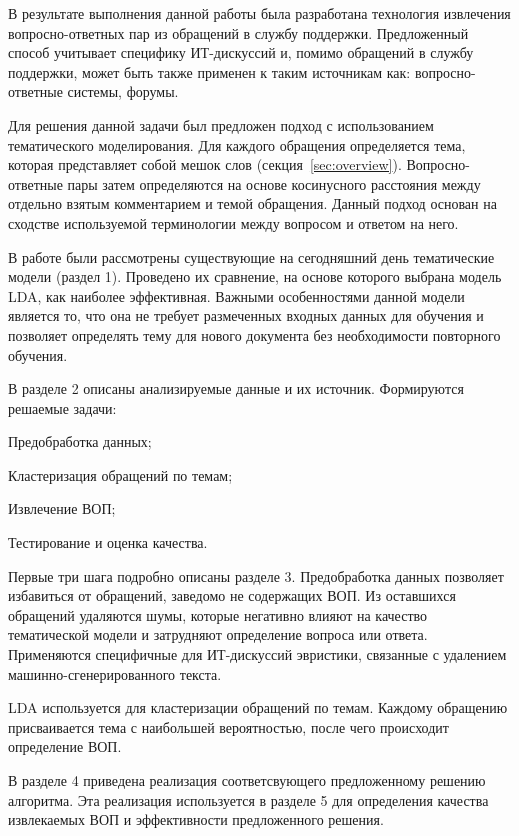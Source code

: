 \conclusion
В результате выполнения данной работы была разработана технология извлечения вопросно-ответных пар из обращений в службу поддержки. Предложенный способ учитывает специфику ИТ-дискуссий и, помимо обращений в службу поддержки, может быть также применен к таким источникам как: вопросно-ответные системы, форумы.

Для решения данной задачи был предложен подход с использованием тематического моделирования. Для каждого обращения определяется тема, которая представляет собой мешок слов (секция~\ref{sec:overview}). Вопросно-ответные пары затем определяются на основе косинусного расстояния между отдельно взятым комментарием и темой обращения. Данный подход основан на сходстве используемой терминологии между вопросом и ответом на него.

В работе были рассмотрены существующие на сегодняшний день тематические модели (раздел 1). Проведено их сравнение, на основе которого выбрана модель LDA, как наиболее эффективная. Важными особенностями данной модели является то, что она не требует размеченных входных данных для обучения и позволяет определять тему для нового документа без необходимости повторного обучения.

В разделе 2 описаны анализируемые данные и их источник. Формируются решаемые задачи: 

\begin{enumerate*}
\item Предобработка данных;
\item Кластеризация обращений по темам;
\item Извлечение ВОП;
\item Тестирование и оценка качества.
\end{enumerate*}

Первые три шага подробно описаны разделе 3. Предобработка данных позволяет избавиться от обращений, заведомо не содержащих ВОП. Из оставшихся обращений удаляются шумы, которые негативно влияют на качество тематической модели и затрудняют определение вопроса или ответа. Применяются специфичные для ИТ-дискуссий эвристики, связанные с удалением машинно-сгенерированного текста. 

LDA используется для кластеризации обращений по темам. Каждому обращению присваивается тема с наибольшей вероятностью, после чего происходит определение ВОП.

В разделе 4 приведена реализация соответсвующего предложенному решению алгоритма. Эта реализация используется в разделе 5 для определения качества извлекаемых ВОП и эффективности предложенного решения.

